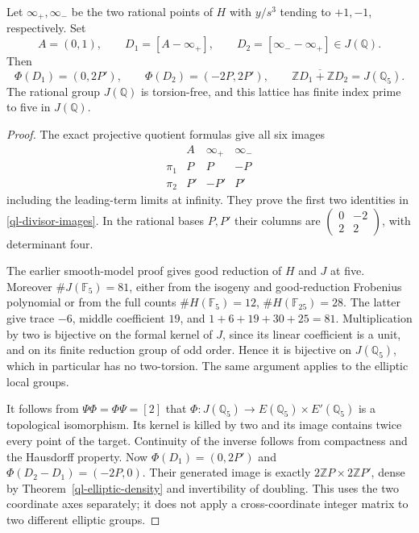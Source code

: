 \begin{theorem}\label{ql-jacobian-density}
Let \(\infty_+,\infty_-\) be the two rational points of \(H\) with
\(y/s^3\) tending to \(+1,-1\), respectively. Set
\[
 A=(0,1),\qquad D_1=[A-\infty_+],\qquad
 D_2=[\infty_--\infty_+]\in J(\mathbb Q).
\]
Then
\begin{equation}\label{ql-divisor-images}
 \Phi(D_1)=(0,2P'),\qquad \Phi(D_2)=(-2P,2P'),\qquad
 \overline{\mathbb ZD_1+\mathbb ZD_2}=J(\mathbb Q_5).
\end{equation}
The rational group \(J(\mathbb Q)\) is torsion-free, and this lattice
has finite index prime to five in \(J(\mathbb Q)\).
\end{theorem}
\begin{proof}
The exact projective quotient formulas give all six images
\[
\begin{array}{c|ccc}
 &A&\infty_+&\infty_-\\ \hline
 \pi_1&P&P&-P\\
 \pi_2&P'&-P'&P'
\end{array}
\]
including the leading-term limits at infinity. They prove the first
two identities in \eqref{ql-divisor-images}. In the rational bases
\(P,P'\) their columns are \(\left(\begin{smallmatrix}0&-2\\2&2\end{smallmatrix}\right)\),
with determinant four.

The earlier smooth-model proof gives good reduction of \(H\) and \(J\)
at five. Moreover \(\#J(\mathbb F_5)=81\), either from the isogeny
and good-reduction Frobenius polynomial or from the full counts
\(\#H(\mathbb F_5)=12\), \(\#H(\mathbb F_{25})=28\). The latter give
trace \(-6\), middle coefficient \(19\), and
\(1+6+19+30+25=81\).
Multiplication by two is bijective on the formal kernel of \(J\),
since its linear coefficient is a unit, and on its finite reduction
group of odd order. Hence it is bijective on \(J(\mathbb Q_5)\),
which in particular has no two-torsion. The same argument applies to
the elliptic local groups.

It follows from \(\Psi\Phi=\Phi\Psi=[2]\) that
\(\Phi:J(\mathbb Q_5)\to E(\mathbb Q_5)\times E'(\mathbb Q_5)\)
is a topological isomorphism. Its kernel is killed by two and its
image contains twice every point of the target. Continuity of the
inverse follows from compactness and the Hausdorff property.
Now \(\Phi(D_1)=(0,2P')\) and
\(\Phi(D_2-D_1)=(-2P,0)\). Their generated image is exactly
\(2\mathbb ZP\times2\mathbb ZP'\), dense by
Theorem~\ref{ql-elliptic-density} and invertibility of doubling.
This uses the two coordinate axes separately; it does not apply a
cross-coordinate integer matrix to two different elliptic groups.


\end{proof}

